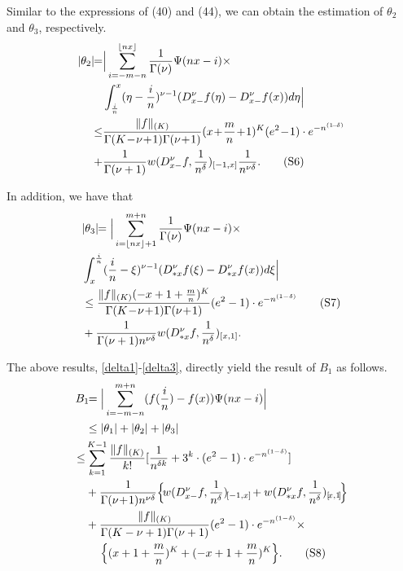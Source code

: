 \documentclass[journal]{IEEEtran}
\begin{document}
{Similar to the expressions of (40) and  (44), we can obtain the estimation of $\theta_{2}$ and $\theta_{3}$, respectively.
\begin{align}\label{dealta2}
|\theta_{2}|\!\!=&\Big|\sum\limits_{i=-m-n}^{\lfloor nx  \rfloor}\frac{1}{\Gamma(\nu)}\Psi(nx-i)\times\notag\\
&\int^{x}_{\frac{i}{n}}(\eta-\frac{i}{n})^{\nu-1}
(D_{x-}^{\nu}f(\eta)-D_{x-}^{\nu}f(x))d\eta\Big|\notag\\
 \leq& \frac{\|f\|_{(K)}}{\Gamma(K\!-\!\nu\!+\!1)\Gamma(\nu\!+\!1)}
(x\!+\!\frac{m}{n}\!+\!1)^{{\color{black}K}}{(e^{2}\!-\!1)}\cdot e^{-n^{(1\!-\!\delta)}}\notag\\
+ &\frac{1}{\Gamma(\nu+1)}w(D_{x-}^{\nu}f,\frac{1}{n^{\delta}})_{[-1,x]}
\frac{1}{n^{\nu\delta}}.\tag{S6}
\end{align}

In addition, we have that
\begin{align}\label{delta3}
&|\theta_{3}|\!\!=\Big|\sum\limits_{i=\lfloor nx\rfloor +1}^{m+n}\frac{1}{\Gamma(\nu)}\Psi(nx-i) \times\notag\\
&\int_{x}^{\frac{i}{n}}(\frac{i}{n}-\xi)^{\nu-1}
(D_{*x}^{\nu}f(\xi)-D_{*x}^{\nu}f(x))d\xi\Big|\notag\\
&\leq  \frac{\|f\|_{(K)}(-x+1+\frac{m}{n})^{K}}{\Gamma(K\!-\!\nu\!+\!1)\Gamma(\nu\!+\!1)}
{(e^{2}-1)}\cdot e^{-n^{(1-\delta)}}\tag{S7}\\
&+\frac{1}{\Gamma(\nu+1)n^{\nu\delta}}w(D_{*x}^{\nu}f,\frac{1}{n^{\delta}})_{[x,1]}.\notag
\end{align}

The above results, \eqref{delta1}-\eqref{delta3}, directly yield  the result of $B_{1}$ 
as follows.
\begin{align}\label{b1}
B_{1}\!\!
&=\Big|\sum\limits_{i=-m-n}^{m+n}(f(\frac{i}{n})-f(x))\Psi(nx-i)\Big|\notag\\
&\leq |\theta_{1}|+|\theta_{2}|+|\theta_{3}|\notag\\
\leq& \sum\limits_{k=1}^{K-1}\frac{\|f\|_{(K)}}{k!}[\frac{1}{n^{\delta k}}
+3^{k}\cdot(e^{2}-1)\cdot e^{-n^{(1-\delta)}}]\notag\\
&+\frac{1}{\Gamma(\nu\!+\!1)n^{\nu\delta}}
{\color{black}\Big\{\!w(D_{x-}^{\nu}f,\frac{1}{n^{\delta}})_{\![-1,x]\!}}
+w(D_{*x}^{\nu}f,\frac{1}{n^{\delta}})_{[\!x,1\!]}\!\Big\}\notag\\
&+\frac{\|f\|_{(K)}}{\Gamma(K-\nu+1)\Gamma(\nu+1)}{(e^{2}-1)}\cdot e^{-n^{(1-\delta)}}\times\notag\\
&~~~~\Big\{(x+1+\frac{m}{n})^{K}+(-x+1+\frac{m}{n})^{K}\Big\}.\tag{S8}
\end{align}

}
\end{document}
